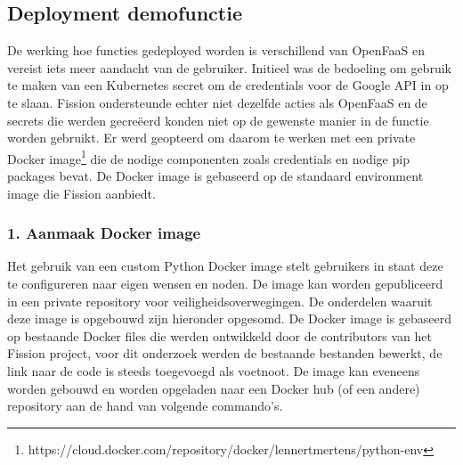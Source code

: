 \subsection{Deployment demofunctie}
De werking hoe functies gedeployed worden is verschillend van OpenFaaS en vereist iets meer aandacht van de gebruiker. Initieel was de bedoeling om gebruik te maken van een Kubernetes secret om de credentials voor de Google API in op te slaan. Fission ondersteunde echter niet dezelfde acties als OpenFaaS en de secrets die werden gecreëerd konden niet op de gewenste manier in de functie worden gebruikt. Er werd geopteerd om daarom te werken met een private Docker image\footnote{https://cloud.docker.com/repository/docker/lennertmertens/python-env} die de nodige componenten zoals credentials en nodige pip packages bevat. De Docker image is gebaseerd op de standaard environment image die Fission aanbiedt.

\subsubsection{1. Aanmaak Docker image}
Het gebruik van een custom Python Docker image stelt gebruikers in staat deze te configureren naar eigen wensen en noden. De image kan worden gepubliceerd in een private repository voor veiligheidsoverwegingen. De onderdelen waaruit deze image is opgebouwd zijn hieronder opgesomd. De Docker image is gebaseerd op bestaande Docker files die werden ontwikkeld door de contributors van het Fission project, voor dit onderzoek werden de bestaande bestanden bewerkt, de link naar de code is steeds toegevoegd als voetnoot. De image kan eveneens worden gebouwd en worden opgeladen naar een Docker hub (of een andere) repository aan de hand van volgende commando's.

